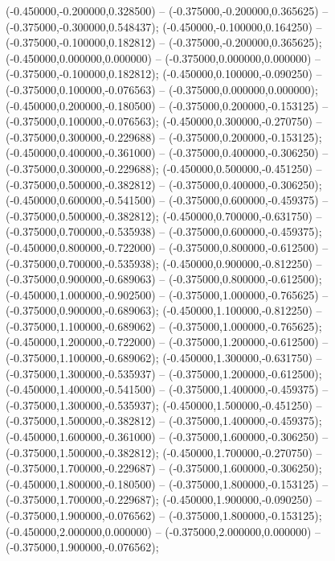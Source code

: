  (-0.450000,-0.200000,0.328500) -- (-0.375000,-0.200000,0.365625) -- (-0.375000,-0.300000,0.548437);
 (-0.450000,-0.100000,0.164250) -- (-0.375000,-0.100000,0.182812) -- (-0.375000,-0.200000,0.365625);
 (-0.450000,0.000000,0.000000) -- (-0.375000,0.000000,0.000000) -- (-0.375000,-0.100000,0.182812);
 (-0.450000,0.100000,-0.090250) -- (-0.375000,0.100000,-0.076563) -- (-0.375000,0.000000,0.000000);
 (-0.450000,0.200000,-0.180500) -- (-0.375000,0.200000,-0.153125) -- (-0.375000,0.100000,-0.076563);
 (-0.450000,0.300000,-0.270750) -- (-0.375000,0.300000,-0.229688) -- (-0.375000,0.200000,-0.153125);
 (-0.450000,0.400000,-0.361000) -- (-0.375000,0.400000,-0.306250) -- (-0.375000,0.300000,-0.229688);
 (-0.450000,0.500000,-0.451250) -- (-0.375000,0.500000,-0.382812) -- (-0.375000,0.400000,-0.306250);
 (-0.450000,0.600000,-0.541500) -- (-0.375000,0.600000,-0.459375) -- (-0.375000,0.500000,-0.382812);
 (-0.450000,0.700000,-0.631750) -- (-0.375000,0.700000,-0.535938) -- (-0.375000,0.600000,-0.459375);
 (-0.450000,0.800000,-0.722000) -- (-0.375000,0.800000,-0.612500) -- (-0.375000,0.700000,-0.535938);
 (-0.450000,0.900000,-0.812250) -- (-0.375000,0.900000,-0.689063) -- (-0.375000,0.800000,-0.612500);
 (-0.450000,1.000000,-0.902500) -- (-0.375000,1.000000,-0.765625) -- (-0.375000,0.900000,-0.689063);
 (-0.450000,1.100000,-0.812250) -- (-0.375000,1.100000,-0.689062) -- (-0.375000,1.000000,-0.765625);
 (-0.450000,1.200000,-0.722000) -- (-0.375000,1.200000,-0.612500) -- (-0.375000,1.100000,-0.689062);
 (-0.450000,1.300000,-0.631750) -- (-0.375000,1.300000,-0.535937) -- (-0.375000,1.200000,-0.612500);
 (-0.450000,1.400000,-0.541500) -- (-0.375000,1.400000,-0.459375) -- (-0.375000,1.300000,-0.535937);
 (-0.450000,1.500000,-0.451250) -- (-0.375000,1.500000,-0.382812) -- (-0.375000,1.400000,-0.459375);
 (-0.450000,1.600000,-0.361000) -- (-0.375000,1.600000,-0.306250) -- (-0.375000,1.500000,-0.382812);
 (-0.450000,1.700000,-0.270750) -- (-0.375000,1.700000,-0.229687) -- (-0.375000,1.600000,-0.306250);
 (-0.450000,1.800000,-0.180500) -- (-0.375000,1.800000,-0.153125) -- (-0.375000,1.700000,-0.229687);
 (-0.450000,1.900000,-0.090250) -- (-0.375000,1.900000,-0.076562) -- (-0.375000,1.800000,-0.153125);
 (-0.450000,2.000000,0.000000) -- (-0.375000,2.000000,0.000000) -- (-0.375000,1.900000,-0.076562);
